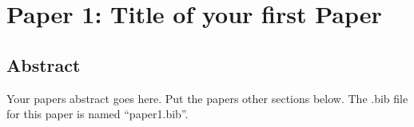 \chapter{Paper 1: Title of your first Paper}

\section{Abstract}

Your papers abstract goes here. Put the papers other sections below.
The .bib file for this paper is named ``paper1.bib''.

\singlespacing


\doublespacing
